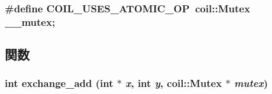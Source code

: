 \subsubsection[{COIL\_\-USES\_\-ATOMIC\_\-OP}]{\setlength{\rightskip}{0pt plus 5cm}\#define COIL\_\-USES\_\-ATOMIC\_\-OP~{\bf coil::Mutex} \_\-\_\-mutex;}\label{atomic_8h_aa3a3b38e82e6515e0b984532de4ca8b6}


\subsection{関数}
\subsubsection[{exchange\_\-add}]{\setlength{\rightskip}{0pt plus 5cm}int exchange\_\-add (int $\ast$ {\em x}, \/  int {\em y}, \/  {\bf coil::Mutex} $\ast$ {\em mutex})}\label{atomic_8h_a29a8d5c103d5dae310ea72b991f6afc0}

